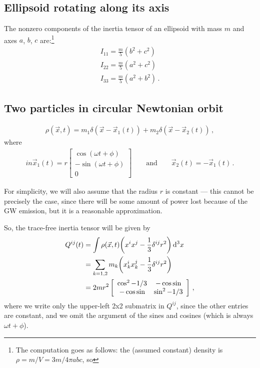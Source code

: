 \documentclass[main.tex]{subfiles}
\begin{document}
\subsection{Ellipsoid rotating along its axis}


The nonzero components of the inertia tensor of an ellipsoid with mass \(m\) and axes \(a\), \(b\), \(c\) are:\footnote{
    The computation goes as follows: the (assumed constant) density is \(\rho = m / V = 3m / 4 \pi abc\), so 
}
%
\begin{align}
I_{11} = \frac{m}{5} (b^2 + c^2) \\
I_{22} = \frac{m}{5} (a^2 + c^2) \\
I_{33} = \frac{m}{5} (a^2 + b^2) 
\,.
\end{align}



\subsection{Two particles in circular Newtonian orbit}

%
\begin{align}
\rho (\vec{x}, t) = m_1 \delta (\vec{x} - \vec{x}_1(t)) + m_2 \delta (\vec{x} - \vec{x}_2 (t))                                                                        
\,,
\end{align}
%
where 
%
\begin{align}in
\vec{x}_1 (t) = r \left[\begin{array}{c}
\cos(\omega t + \phi ) \\ 
- \sin(\omega t + \phi ) \\ 
0
\end{array}\right]
\qquad \text{and} \qquad
\vec{x}_2 (t) = - \vec{x}_1 (t)
\,.
\end{align}

For simplicity, we will also assume that the radius \(r\) is constant --- this cannot be precisely the case, since there will be some amount of power lost because of the GW emission, but it is a reasonable approximation.

So, the trace-free inertia tensor will be given by 
%
\begin{align}
Q^{ij} (t) &= \int \rho (\vec{x}, t) \qty( x^{i} x^{j} - \frac{1}{3} \delta^{ij} r^2) \dd[3]{x}  \\
&= \sum _{k=1, 2} m_k \qty(x_k^{i} x_k^{j} - \frac{1}{3} \delta^{ij} r^2)  \\
&= 2 m r^2 \left[\begin{array}{cc}
\cos^2 - 1/3 & - \cos \sin \\ 
- \cos \sin & \sin^2 - 1/3  
\end{array}\right] 
\,,
\end{align}
%
where we write only the upper-left 2x2 submatrix in \(Q^{ij}\), since the other entries are constant, and we omit the argument of the sines and cosines (which is always \(\omega t + \phi \)). 
\end{document}
